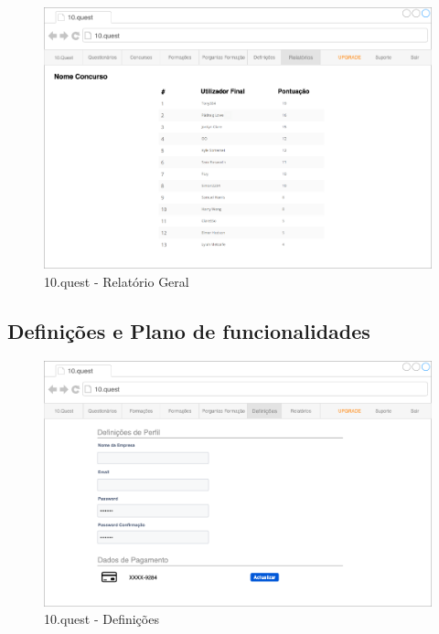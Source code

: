 \begin{figure}[ht!]
	\begin{center}
		\includegraphics[width=1\textwidth]{img/prototipos/rl.png}
		\caption{10.quest - Relatório Geral}
		\label{10q-}
	\end{center}
\end{figure}


\newpage

\subsection{Definições e Plano de funcionalidades}


\begin{figure}[ht!]
	\begin{center}
		\includegraphics[width=1\textwidth]{img/prototipos/20.png}
		\caption{10.quest - Definições}
		\label{10q-}
	\end{center}
\end{figure}

